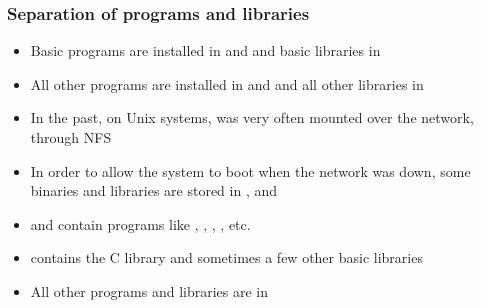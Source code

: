 \begin{frame}
  \frametitle{Separation of programs and libraries}
  \begin{itemize}
  \item Basic programs are installed in  and 
    and basic libraries in 
  \item All other programs are installed in  and
     and all other libraries in 
  \item In the past, on Unix systems,  was very often
    mounted over the network, through NFS
  \item In order to allow the system to boot when the network was
    down, some binaries and libraries are stored in ,
     and 
  \item {} and  contain programs like ,
    , , , etc.
  \item {} contains the C library and sometimes a few other
    basic libraries
  \item All other programs and libraries are in 
  \end{itemize}
\end{frame}
